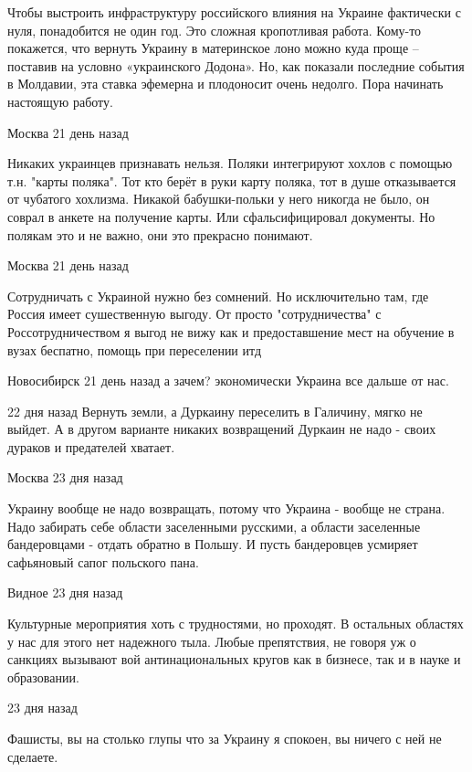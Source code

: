 Чтобы выстроить инфраструктуру российского влияния на Украине фактически с
нуля, понадобится не один год. Это сложная кропотливая работа. Кому-то
покажется, что вернуть Украину в материнское лоно можно куда проще – поставив
на условно «украинского Додона». Но, как показали последние события в Молдавии,
эта ставка эфемерна и плодоносит очень недолго. Пора начинать настоящую работу. 

\begin{itemize}

 Москва 21 день назад  

Никаких украинцев признавать нельзя. Поляки интегрируют хохлов с помощью т.н.
"карты поляка". Тот кто берёт в руки карту поляка, тот в душе
отказывается от чубатого хохлизма. Никакой бабушки-польки у
него никогда не было, он соврал в анкете на получение карты.
Или сфальсифицировал документы. Но полякам это и не важно, они
это прекрасно понимают.

 Москва 21 день назад  

Сотрудничать с Украиной нужно без сомнений. Но исключительно там, где Россия
имеет сушественную выгоду. От просто "сотрудничества" с Россотрудничеством я
выгод не вижу как и предоставшение мест на обучение в вузах беспатно, помощь
при переселении итд

 Новосибирск 21 день назад  
а зачем? экономически Украина все дальше от нас.

 22 дня назад  
Вернуть земли, а Дуркаину переселить в Галичину, мягко не выйдет. А в другом варианте никаких возвращений Дуркаин не надо - своих дураков и предателей хватает.

 Москва 23 дня назад  

Украину вообще не надо возвращать, потому что Украина - вообще не страна. Надо
забирать себе области заселенными русскими, а области заселенные бандеровцами -
отдать обратно в Польшу. И пусть бандеровцев усмиряет сафьяновый сапог
польского пана.

 Видное 23 дня назад  

Культурные мероприятия хоть с трудностями, но проходят. В остальных областях у
нас для этого нет надежного тыла. Любые препятствия, не говоря уж о санкциях
вызывают вой антинациональных кругов как в бизнесе, так и в науке и
образовании.

 23 дня назад  

Фашисты, вы на столько глупы что за Украину я спокоен, вы ничего с ней не сделаете.


\end{itemize}
